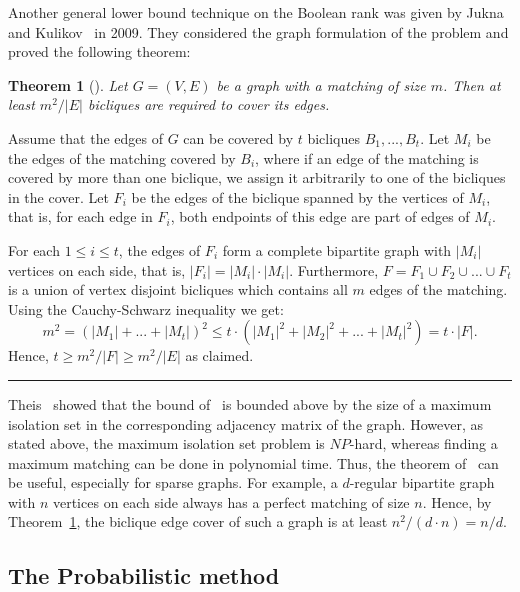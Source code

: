 \documentclass[11pt]{article}
\newtheorem{theorem}{Theorem}
\newcommand{\qedsymb}{\hfill{\rule{2mm}{2mm}}}
\renewenvironment{proof}[1][]{\begin{trivlist}
\item[\hspace{\labelsep}{\bf\noindent Proof#1:\/}] }{\qedsymb\end{trivlist}}
\begin{document}
Another general lower bound technique on the Boolean rank was given by Jukna and Kulikov~\cite{jukna2009covering} in 2009. They considered the graph formulation of the problem
and proved the following theorem:

\begin{theorem}[\cite{jukna2009covering}]
\label{theo-jukna2009}
Let $G = (V,E)$ be a graph with a matching of size $m$. Then at least $m^2/|E|$ bicliques are required to cover its edges.
\end{theorem}
\begin{proof}
Assume that the edges of $G$ can be covered by $t$ bicliques $B_1,...,B_t$. Let $M_i$ be the edges of the matching covered by $B_i$,
where if an edge of the matching is covered by more than one biclique, we assign it arbitrarily to one of the bicliques in the cover.
Let $F_i$ be the edges of the biclique spanned by the vertices of $M_i$,  that is, for each edge in $F_i$, both endpoints of this edge are part of edges of $M_i$.

For each $1 \leq i \leq t$,  the edges of $F_i$ form a complete bipartite graph with $|M_i|$ vertices on each side, that is,  $|F_i| = |M_i| \cdot |M_i|$.
Furthermore, $F = F_1 \cup F_2 \cup ... \cup F_t$ is a union of vertex disjoint bicliques which contains all $m$ edges of the matching.
Using the Cauchy-Schwarz inequality we get:
$$
m^2 = (|M_1| + ... + |M_t|)^2 \leq t \cdot (|M_1|^2 + |M_2|^2 + ... + |M_t|^2) = t \cdot |F|.
$$
Hence, $t \geq m^2 /|F| \geq m^2 /|E|$ as claimed.
\end{proof}

Theis~\cite{theis2007some} showed that the bound of~\cite{jukna2009covering} is bounded above by the size of a maximum isolation set in the corresponding adjacency matrix of the graph.
However, as stated above, the maximum isolation set problem is $NP$-hard, whereas finding a maximum matching can be done in polynomial time.
Thus, the theorem of~\cite{jukna2009covering} can be useful, especially for sparse graphs.
For example, a $d$-regular bipartite graph with $n$ vertices on each side always has a perfect matching of size $n$.
Hence, by Theorem~\ref{theo-jukna2009}, the biclique edge cover of such a graph is at least $n^2/(d\cdot n) = n/d$.



\subsection{The Probabilistic method}
\label{Sec-prob}
\end{document}
